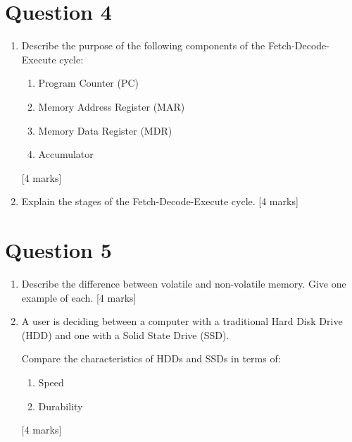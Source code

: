 \documentclass[11pt,a4paper]{article}
\begin{document}
\section*{Question 4}
\begin{enumerate}[label=(\alph*)]
    \item Describe the purpose of the following components of the Fetch-Decode-Execute cycle:
    \begin{enumerate}[label=(\roman*)]
        \item Program Counter (PC)
        \item Memory Address Register (MAR)
        \item Memory Data Register (MDR)
        \item Accumulator
    \end{enumerate}
    [4 marks]
    
    \vspace{8cm}
    
    \item Explain the stages of the Fetch-Decode-Execute cycle. [4 marks]
    
    \vspace{8cm}
\end{enumerate}

\newpage

\section*{Question 5}
\begin{enumerate}[label=(\alph*)]
    \item Describe the difference between volatile and non-volatile memory. Give one example of each. [4 marks]
    
    \vspace{5cm}
    
    \item A user is deciding between a computer with a traditional Hard Disk Drive (HDD) and one with a Solid State Drive (SSD).
    
    Compare the characteristics of HDDs and SSDs in terms of:
    \begin{enumerate}[label=(\roman*)]
        \item Speed
        \item Durability
    \end{enumerate}
    [4 marks]
    
    \vspace{6cm}
\end{enumerate}
\end{document}
